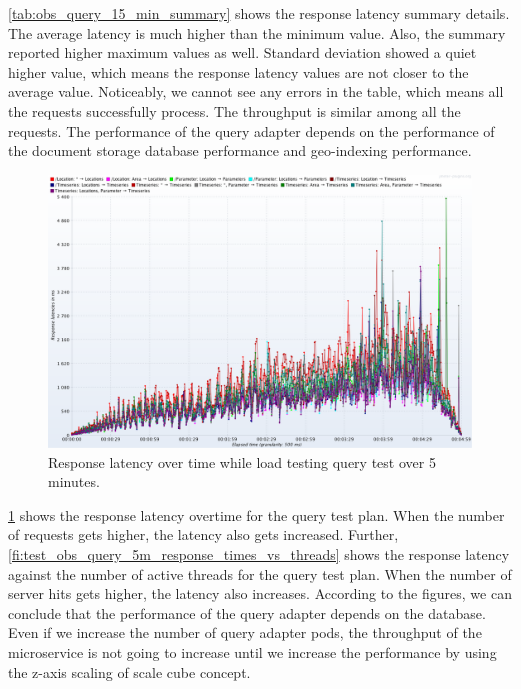 \cref{tab:obs_query_15_min_summary} shows the response latency summary details. The average latency is much higher than the minimum value. Also, the summary reported higher maximum values as well. Standard deviation showed a quiet higher value, which means the response latency values are not closer to the average value. Noticeably, we cannot see any errors in the table, which means all the requests successfully process. The throughput is similar among all the requests. The performance of the query adapter depends on the performance of the document storage database performance and geo-indexing performance.

\begin{figure}[htp]
    \centering
    \includegraphics[width=1.0\textwidth]{results/obs/query/obs_query_5m_latency_over_time.png}
    \caption{Response latency over time while load testing query test over 5 minutes.}
    \label{fi:test_obs_query_5m_response_latency}
\end{figure}
\cref{fi:test_obs_query_5m_response_latency} shows the response latency overtime for the query test plan. When the number of requests gets higher, the latency also gets increased. Further, \cref{fi:test_obs_query_5m_response_times_vs_threads} shows the response latency against the number of active threads for the query test plan. When the number of server hits gets higher, the latency also increases. According to the figures, we can conclude that the performance of the query adapter depends on the database. Even if we increase the number of query adapter pods, the throughput of the microservice is not going to increase until we increase the performance by using the z-axis scaling of scale cube concept.

